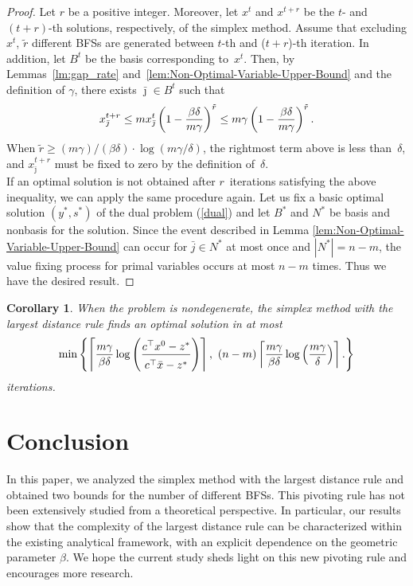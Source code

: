 \documentclass[12pt]{article}
\newtheorem{corollary}{Corollary}[section]
\newcommand{\getheight}{\rule{0em}{2.5ex}}
\begin{document}
\begin{proof}
Let $r$ be a positive integer. 
Moreover, let $x^t$ and $x^{t+r}$ be the $t$- and $(t+r)$-th solutions, respectively, of the simplex method. 
Assume that excluding $x^t$, $\tilde{r}$ different BFSs are generated between $t$-th and ($t+r$)-th iteration.
In addition, let $B^t$ be the basis corresponding to~$x^t$. 
Then, by Lemmas~\ref{lm:gap_rate} and~\ref{lem:Non-Optimal-Variable-Upper-Bound} and the definition of $\gamma$, there exists $\bar{\jmath}\in B^t$ such that 
\begin{equation} \notag
  x_{\bar{\jmath}}^{t+r} \le m x_{\bar{\jmath}}^t \left( 1 - \frac{\beta\delta}{m\gamma} \right)^{\tilde{r}} \le m \gamma \left( 1 - \frac{\beta\delta}{m\gamma} \right)^{\tilde{r}}.
\end{equation}
When $\tilde{r} \geq (m\gamma)/(\beta\delta) \cdot \log\left(m\gamma/\delta\right)$, the rightmost term above is less than~$\delta$, and $x_{\bar{\jmath}}^{t+r}$ must be fixed to zero by the definition of~$\delta$.\\

If an optimal solution is not obtained after $r$~iterations satisfying the above inequality, we can apply the same procedure again.
Let us fix a basic optimal solution $(y^*,s^*)$ of the dual problem (\ref{dual}) and let $B^*$ and $N^*$ be basis and nonbasis for the solution. 
Since the event described in Lemma \ref{lem:Non-Optimal-Variable-Upper-Bound} can occur for $\bar{j} \in N^*$ at most once and $|N^*|=n-m$, 
the value fixing process for primal variables occurs at most $n-m$ times. 
Thus we have the desired result.
\end{proof}
%
\begin{corollary}
When the problem is nondegenerate, the simplex method with the largest distance rule finds an optimal solution in at most
\[
\min\left\{
  \left\lceil \frac{m\gamma}{\beta \delta} \log\left( \frac{\getheight c^{\top}x^0-z^*}{\getheight c^{\top}\bar{x}-z^*} \right) \right\rceil,~
(n-m) \left\lceil \frac{m\gamma}{\beta \delta} \log\left(\frac{m\gamma}{\delta}\right) \right\rceil.
\right\}
\]
iterations.
\end{corollary}
%
\section{Conclusion}
In this paper, we analyzed the simplex method with the largest distance rule and obtained two bounds for the number of different BFSs. 
This pivoting rule has not been extensively studied from a theoretical perspective.
In particular, our results show that the complexity of the largest distance rule can be characterized within the existing analytical framework, with an explicit dependence on the geometric parameter $\beta$.
We hope the current study sheds light on this new pivoting rule and encourages more research. \\
\end{document}
